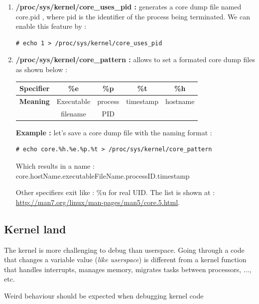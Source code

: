 \begin{enumerate}
		\begin{enumerate}
			\item \textbf{/proc/sys/kernel/core\_uses\_pid : } generates a core dump file named \og core.pid \fg, where pid is the identifier of the process being terminated. We can enable this feature by :
	\begin{lstlisting}[style=BashInputStyle]		
# echo 1 > /proc/sys/kernel/core_uses_pid			
\end{lstlisting}			
			\item \textbf{/proc/sys/kernel/core\_pattern : } allows to set a formated core dump files as shown below :
\begin{center}
	\begin{tabular}{|c|c|c|c|c|}
		\hline
		\rowcolor{LightCyan} 
			\textbf{Specifier} & \textbf{\%e} & \textbf{\%p} & \textbf{\%t} & \textbf{\%h}\\	   		
   		\hline
   		\textbf{Meaning} & Executable & process & timestamp & hostname\\
        	             & filename   & PID &  & \\
   		\hline
	\end{tabular}
\end{center}			
			
\textbf{\color{orange}Example :} let's save a core dump file with the naming format :	
	\begin{lstlisting}[style=BashInputStyle]
# echo core.%h.%e.%p.%t > /proc/sys/kernel/core_pattern
\end{lstlisting}	

Which results in a name : \og core.hostName.executableFileName.processID.timestamp \fg

Other specifiers exit like : \%u for real UID. The list is shown at : {\color{blue}\url{http://man7.org/linux/man-pages/man5/core.5.html}}.
		\end{enumerate}
\end{enumerate}

\subsection{Kernel land}
The kernel is more challenging to debug than userspace. Going through a code that changes a variable value (\textit{like userspace}) is different from a kernel function that handles interrupts, manages memory, migrates tasks between processors, ..., etc.\\
\begin{center}\color{orange}
Weird behaviour should be expected when debugging kernel code
\end{center}  


